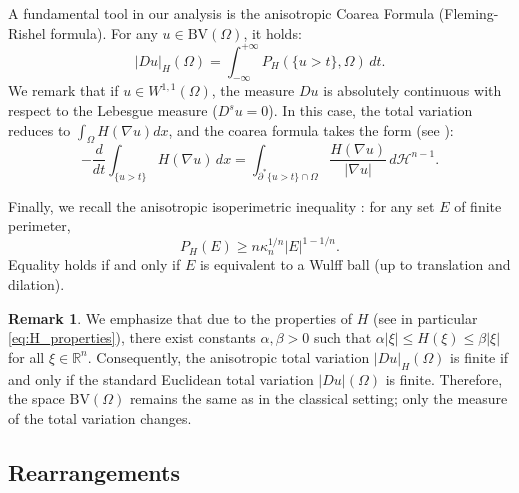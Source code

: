\documentclass[oneside,a4paper,12pt,notitlepage]{article}
\theoremstyle{definition}
\newtheorem{remark}[theorem]{Remark}
\newcommand{\R}{\mathbb{R}}
\newcommand{\BV}{\text{BV}}
\begin{document}
A fundamental tool in our analysis is the anisotropic Coarea Formula (Fleming-Rishel formula). For any $u \in \BV(\Omega)$, it holds:
\begin{equation} \label{eq:coarea}
    |Du|_H(\Omega) = \int_{-\infty}^{+\infty} P_H(\{u > t\}, \Omega) \, dt.
\end{equation}
We remark that if $u \in W^{1,1}(\Omega)$, the measure $Du$ is absolutely continuous with respect to the Lebesgue measure ($D^s u = 0$). In this case, the total variation reduces to $\int_\Omega H(\nabla u) dx$, and the coarea formula takes the  form (see \cite{ALT90}):
\begin{equation} \label{AFLTAB}
    -\frac{d}{dt}\int_{\{u>t\}} H(\nabla u)\,dx = \int_{\partial^*\{u>t\}\cap \Omega} \frac{H(\nabla u)}{|\nabla u|}\,d\mathcal{H}^{n-1}.
\end{equation}

Finally, we recall the anisotropic isoperimetric inequality \cite{busemann1949isoperimetric, dacorogna1992wulff, fonseca1991uniqueness}: for any set $E$ of finite perimeter,
\begin{equation} \label{eq:isoperimetric}
    P_H(E) \geq n \kappa_n^{1/n} |E|^{1 - 1/n}.
\end{equation}
Equality holds if and only if $E$ is equivalent to a Wulff ball (up to translation and dilation).
\begin{remark}

We emphasize that due to the properties of $H$ (see in particular \eqref{eq:H_properties}), there exist constants $\alpha, \beta > 0$ such that $\alpha|\xi| \le H(\xi) \le \beta|\xi|$ for all $\xi \in \R^n$. Consequently, the anisotropic total variation $|Du|_H(\Omega)$ is finite if and only if the standard Euclidean total variation $|Du|(\Omega)$ is finite. Therefore, the space $\BV(\Omega)$ remains the same as in the classical setting; only the measure of the total variation changes.
\end{remark}

\subsection{Rearrangements}\label{prel:rearrangements}
\end{document}
